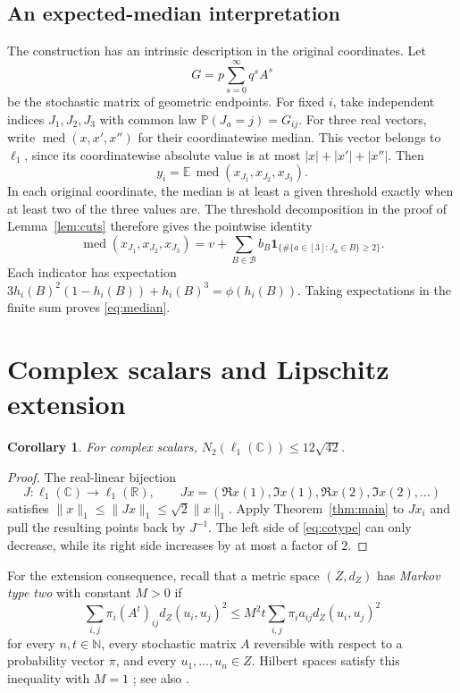 \documentclass[11pt]{article}
\newtheorem{corollary}[theorem]{Corollary}
\theoremstyle{definition}
\theoremstyle{remark}
\numberwithin{equation}{section}
\newcommand{\R}{\mathbb R}
\newcommand{\N}{\mathbb N}
\newcommand{\E}{\mathbb E}
\newcommand{\Prob}{\mathbb P}
\newcommand{\ind}{\mathbf 1}
\DeclareMathOperator{\med}{med}
\begin{document}
\subsection{An expected-median interpretation}
The construction has an intrinsic description in the original
coordinates. Let
\[
 G=p\sum_{s=0}^\infty q^s A^s
\]
be the stochastic matrix of geometric endpoints. For fixed $i$,
take independent indices $J_1,J_2,J_3$ with common law
$\Prob(J_a=j)=G_{ij}$. For three real vectors, write
$\med(x,x',x'')$ for their coordinatewise median. This vector
belongs to $\ell_1$, since its coordinatewise absolute value is
at most $|x|+|x'|+|x''|$. Then
\begin{equation}\label{eq:median}
 y_i=\E\,\med(x_{J_1},x_{J_2},x_{J_3}).
\end{equation}
In each original coordinate, the median is at least a given
threshold exactly when at least two of the three values are.
The threshold decomposition in the proof of
Lemma~\ref{lem:cuts} therefore gives the pointwise identity
\[
 \med(x_{J_1},x_{J_2},x_{J_3})
 =v+\sum_{B\in\mathcal B} b_B
       \ind_{\{\#\{a\in[3]:J_a\in B\}\geq2\}}.
\]
Each indicator has expectation
$3h_i(B)^2(1-h_i(B))+h_i(B)^3=\phi(h_i(B))$.
Taking expectations in the finite sum proves \eqref{eq:median}.

\section{Complex scalars and Lipschitz extension}
\label{sec:consequences}

\begin{corollary}\label{cor:complex}
For complex scalars,
$N_2(\ell_1(\mathbb C))\leq12\sqrt{42}$.
\end{corollary}
\begin{proof}
The real-linear bijection
\[
 J:\ell_1(\mathbb C)\longrightarrow\ell_1(\R),\qquad
 Jx=(\Re x(1),\Im x(1),\Re x(2),\Im x(2),\ldots)
\]
satisfies
$\|x\|_1\leq\|Jx\|_1\leq\sqrt2\|x\|_1$.
Apply Theorem~\ref{thm:main} to $Jx_i$ and pull the resulting
points back by $J^{-1}$. The left side of \eqref{eq:cotype}
can only decrease, while its right side increases by at most
a factor of $2$.
\end{proof}

For the extension consequence, recall that a metric space
$(Z,d_Z)$ has \emph{Markov type two} with constant $M>0$ if
\[
 \sum_{i,j}\pi_i(A^t)_{ij}d_Z(u_i,u_j)^2
 \leq M^2t\sum_{i,j}\pi_i a_{ij}d_Z(u_i,u_j)^2
\]
for every $n,t\in\N$, every stochastic matrix $A$ reversible
with respect to a probability vector $\pi$, and every
$u_1,\ldots,u_n\in Z$. Hilbert spaces satisfy this inequality
with $M=1$ \cite{Ball92}; see also \cite[Definition~1.1 and the following
discussion]{MendelNaor13}.
\end{document}

